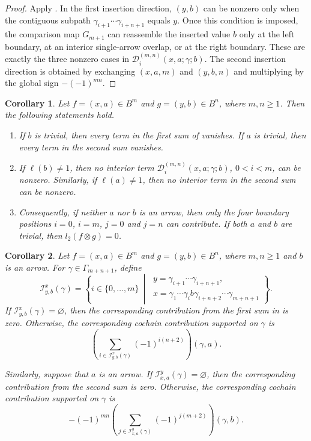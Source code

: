 \documentclass[11pt,a4paper,reqno]{amsart}
\newcommand{\mD}{\mathcal D}
\newcommand{\mI}{\mathcal I}
\newcommand{\para}[2]{(#1,#2)}
\theoremstyle{plain}
\newtheorem{corollary}[corollary]{Corollary}
\theoremstyle{definition}
\numberwithin{equation}{section}
\begin{document}
	\begin{proof}
		Apply .  In the first insertion direction,
		$\para{y}{b}$ can be nonzero only when the contiguous subpath
		$\gamma_{i+1}\cdots\gamma_{i+n+1}$ equals $y$.  Once this condition is imposed,
		the comparison map $G_{m+1}$ can reassemble the inserted value $b$ only at
		the left boundary, at an interior single-arrow overlap, or at the right
		boundary.  These are exactly the three nonzero cases in
		$\mD_i^{(m,n)}(x,a;\gamma;b)$.  The second insertion direction is obtained
		by exchanging $(x,a,m)$ and $(y,b,n)$ and multiplying by the global sign
		$-(-1)^{mn}$.
	\end{proof}
	\begin{corollary}
		\label{cor:higher-value-length-reduction}
		Let $f=\para{x}{a}\in B^m$ and $g=\para{y}{b}\in B^n$, where $m,n\geq1$.
		Then the following statements hold.
		
		\begin{enumerate}
			\item If $b$ is trivial, then every term in the first sum of
			 vanishes.  If $a$ is trivial, then every term in the
			second sum vanishes.
			
			\item If $\ell(b)\neq1$, then no interior term
			$\mD_i^{(m,n)}(x,a;\gamma;b)$, $0<i<m$,
			can be nonzero.  Similarly, if $\ell(a)\neq1$, then no interior term
			in the second sum can be nonzero.
			
			\item Consequently, if neither $a$ nor $b$ is an arrow, then only
			the four boundary positions
			$i=0$, $i=m$, $j=0$ and $j=n$
			can contribute.  If both $a$ and $b$ are trivial, then $l_2(f\otimes g)=0$.
		\end{enumerate}
	\end{corollary}
	\begin{corollary}
		\label{cor:higher-arrow-reassembly}
		Let $f=\para{x}{a}\in B^m$ and $g=\para{y}{b}\in B^n$, where
		$m,n\geq1$ and $b$ is an arrow.
		For
		$\gamma\in\Gamma_{m+n+1}$, define
		\[
		\mI_{y,b}^{x}(\gamma)
		=
		\left\{
		i\in\{0,\ldots,m\}
		\ \middle|\
		\begin{array}{l}
			y=\gamma_{i+1}\cdots\gamma_{i+n+1},\\
			x=\gamma_1\cdots\gamma_i
			b
			\gamma_{i+n+2}\cdots\gamma_{m+n+1}
		\end{array}
		\right\}.
		\]
		If $\mI_{y,b}^{x}(\gamma)=\varnothing$, then the corresponding
		contribution from the first sum in  is zero.  Otherwise,
		the corresponding cochain contribution supported on $\gamma$ is
		\[
		\left(
		\sum_{i\in\mI_{y,b}^{x}(\gamma)}
		(-1)^{i(n+2)}
		\right)\para{\gamma}{a}.
		\]
		
		Similarly, suppose that $a$ is an arrow.  If
		$\mI_{x,a}^{y}(\gamma)=\varnothing$, then the corresponding
		contribution from the second sum is zero.  Otherwise, the corresponding
		cochain contribution supported on $\gamma$ is
		\[
		-(-1)^{mn}
		\left(
		\sum_{j\in\mI_{x,a}^{y}(\gamma)}
		(-1)^{j(m+2)}
		\right)\para{\gamma}{b}.
		\]
	\end{corollary}
	
\end{document}
